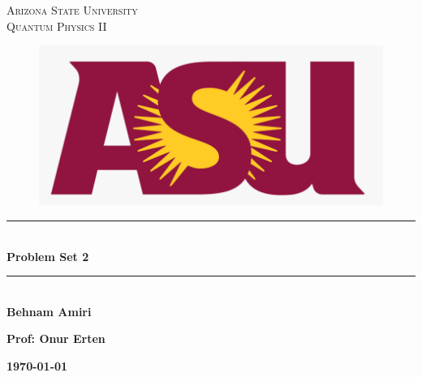 \documentclass[fleqn]{article}
\begin{document}
  \begin{titlepage}

    \newcommand{\HRule}{\rule{\linewidth}{0.5mm}}

    \center


    \textsc{\LARGE Arizona State University}\\[1.5cm]

    \textsc{\LARGE Quantum Physics II}\\[1.5cm]


    \begin{figure}
      \includegraphics[width=\linewidth]{asu.png}
    \end{figure}


    \HRule \\[0.4cm]
    { \huge \bfseries Problem Set 2}\\[0.4cm] 
    \HRule \\[1.5cm]

    \textbf{Behnam Amiri}

    \bigbreak

    \textbf{Prof: Onur Erten}

    \bigbreak


    \textbf{{\large \today}\\[2cm]}

    \vfill

  \end{titlepage}
\end{document}
